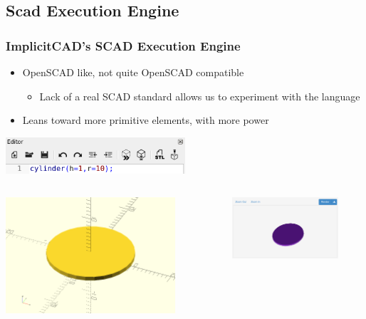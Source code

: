 \documentclass{beamer}
\begin{document}
\subsection{Scad Execution Engine}
\begin{frame}
\frametitle{ImplicitCAD's SCAD Execution Engine}
\begin{itemize}
\item OpenSCAD like, not quite OpenSCAD compatible
\begin{itemize}
\item Lack of a real SCAD standard allows us to experiment with the language
\end{itemize}
\item Leans toward more primitive elements, with more power
\end{itemize}
\includegraphics[width=0.5\textwidth, center]{openscad-cylinder-text.png}
\begin{columns}
  \begin{column}{0.5\textwidth}
    \includegraphics[width=0.8\textwidth, left]{openscad-cylinder.png}
  \end{column}
  \begin{column}{0.5\textwidth}
    \includegraphics[width=0.8\textwidth, right]{implicitcad-cylinder.png}
  \end{column}
\end{columns}
\end{frame}
\end{document}
